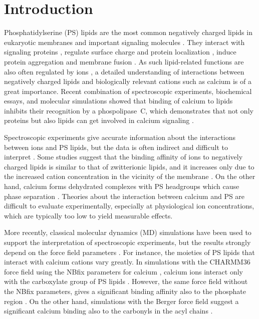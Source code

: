 \documentclass[journal=jctcce,manuscript=article]{achemso}
\begin{document}
 
 
 
\section{Introduction} 

Phosphatidylserine (PS) lipids are the most common negatively charged lipids in eukaryotic membranes
and important signaling molecules \cite{lemmon08,leventis10,li14}.
They interact with signaling proteins \cite{leventis10},
regulate surface charge and protein localization \cite{yeung08}, 
induce protein aggregation \cite{zhao04,gorbenko06} and membrane fusion \cite{wilschut1981calcium, papahadjopoulos90, verma2018cell}.
As such lipid-related functions are also often regulated by ions \cite{leventis10},
a detailed understanding of interactions between negatively charged lipids and biologically relevant cations such as calcium is of a great importance.
Recent combination of spectroscopic experiments, biochemical essays, and molecular simulations showed that binding of
calcium to  lipids inhibits their recognition by a phospolipase~C, 
which demonstrates that not only proteins but also lipids can get involved in calcium signaling \cite{Bilkova2017Calcium}.

Spectroscopic experiments give accurate information about the
interactions between ions and PS lipids, but the data is often indirect and difficult to
interpret \cite{hauser77,kurland79,eisenberg79,hauser83,dluhy83,hauser85,feigenson86,mattai89,roux90,roux91}.
Some studies suggest that the
binding affinity of ions to negatively charged lipids is similar to that of zwitterionic lipids,
and it increases only due to the increased cation
concentration in the vicinity of the membrane \cite{seelig90,sinn06}.
On the other hand, calcium forms dehydrated complexes with PS headgroups
which cause phase separation \cite{hauser77,kurland79,hauser85,feigenson86,mattai89,roux90,roux91,boettcher11}.
Theories about the interaction between calcium and PS 
are difficult to evaluate experimentally,
especially at physiological ion concentrations,
which are typically too low to yield measurable effects.

More recently, classical molecular dynamics (MD) simulations
have been used to support the interpretation of spectroscopic experiments,
but the results strongly depend on the force field parameters \cite{boettcher11,kucerka14,melcrova16,hallock18,valentine18}.
For instance, the moieties of PS lipids that interact with calcium cations vary greatly.
In simulations with the CHARMM36 force field \cite{klauda10,venable13} using the NBfix parameters for calcium \cite{kim16}, 
calcium ions interact only with the carboxylate group of PS lipids \cite{valentine18}.
However, the same force field without the NBfix parameters, gives a significant binding affinity also to the phosphate region \cite{hallock18}.
On the other hand, simulations with the Berger force field \cite{berger97,mukhopadhyay04}
suggest a significant calcium binding also to the carbonyls in the acyl chains \cite{melcrova16}.
\end{document}
